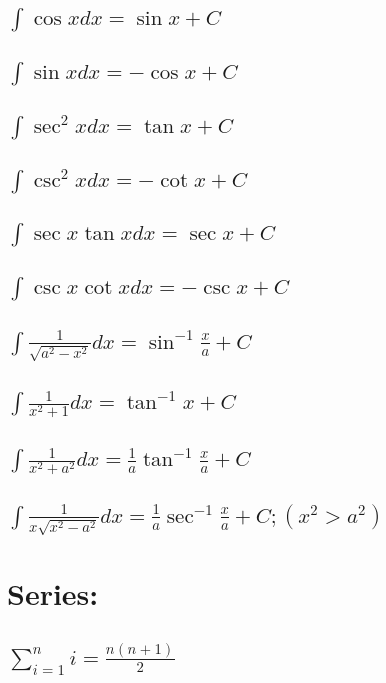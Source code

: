 \documentclass[27pt]{article}
\begin{document}
 \subsection{$ \int \cos xdx = \sin x + C $}  
 \subsection{$ \int \sin xdx = - \cos x + C $}
 \subsection{$ \int \sec^2 xdx = \tan x + C $}  
 \subsection{$ \int \csc^2 xdx = - \cot x + C $} 
 \subsection{$ \int \sec x \tan xdx = \sec x + C $} 
 \subsection{$ \int \csc x \cot xdx = - \csc x + C $}
 \subsection{$ \int \frac{1}{\sqrt{a^2-x^2}} dx = \sin^{-1} \frac{x}{a} + C $}  
 \subsection{$ \int \frac{1}{x^2+1} dx = \tan^{-1} x + C $} 
 \subsection{$ \int \frac{1}{{x^2+a^2}} dx = \frac{1}{a} \tan^{-1} \frac{x}{a} + C $} 
 \subsection{$ \int \frac{1}{x\sqrt{x^2-a^2}}dx = \frac{1}{a} \sec^{-1} \frac{x}{a}+C ;  (x^2>a^2)$}

\section{Series:} 
 \subsection{ $\displaystyle \sum_{i=1}^{n}{i}=\frac{n(n+1)}{2} $}
\end{document}
